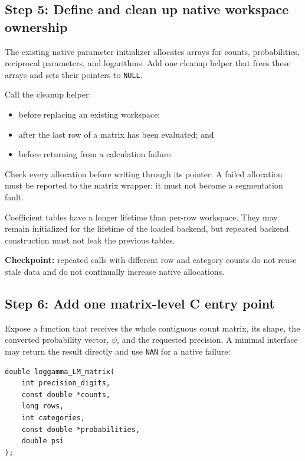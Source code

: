 \documentclass[11pt,a4paper]{article}
\begin{document}
\subsection{Step 5: Define and clean up native workspace ownership}

The existing native parameter initializer allocates arrays for counts,
probabilities, reciprocal parameters, and logarithms. Add one cleanup helper
that frees these arrays and sets their pointers to \texttt{NULL}.

Call the cleanup helper:

\begin{itemize}

\item before replacing an existing workspace;

\item after the last row of a matrix has been evaluated; and

\item before returning from a calculation failure.

\end{itemize}

Check every allocation before writing through its pointer. A failed allocation
must be reported to the matrix wrapper; it must not become a segmentation
fault.

Coefficient tables have a longer lifetime than per-row workspace. They may
remain initialized for the lifetime of the loaded backend, but repeated backend
construction must not leak the previous tables.

\textbf{Checkpoint:} repeated calls with different row and category counts do
not reuse stale data and do not continually increase native allocations.

\subsection{Step 6: Add one matrix-level C entry point}

Expose a function that receives the whole contiguous count matrix, its shape,
the converted probability vector, \(\psi\), and the requested precision. A
minimal interface may return the result directly and use \texttt{NAN} for a
native failure:

\begin{verbatim}
double loggamma_LM_matrix(
    int precision_digits,
    const double *counts,
    long rows,
    int categories,
    const double *probabilities,
    double psi
);
\end{verbatim}
\end{document}
